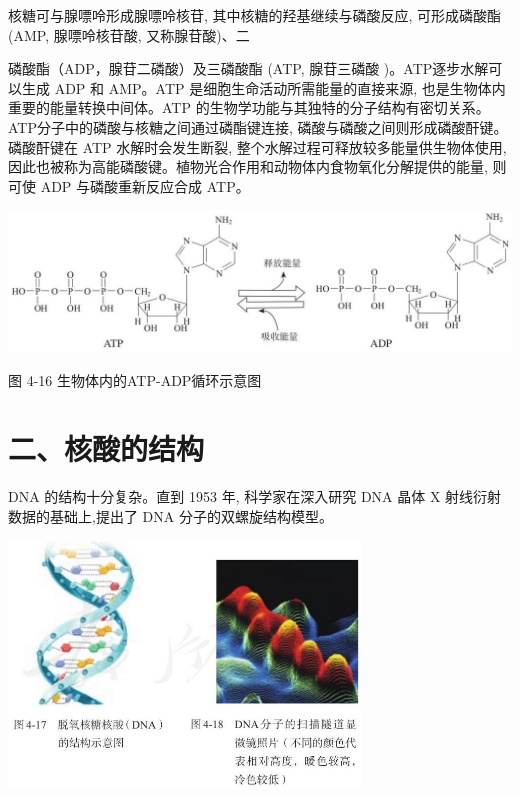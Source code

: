 \documentclass[10pt]{article}
\begin{document}
核糖可与腺嘌呤形成腺嘌呤核苷, 其中核糖的羟基继续与磷酸反应, 可形成磷酸酯 (AMP, 腺嘌呤核苷酸, 又称腺苷酸)、二

磷酸酯（ADP，腺苷二磷酸）及三磷酸酯 (ATP, 腺苷三磷酸 )。ATP逐步水解可以生成 ADP 和 AMP。ATP 是细胞生命活动所需能量的直接来源, 也是生物体内重要的能量转换中间体。ATP 的生物学功能与其独特的分子结构有密切关系。ATP分子中的磷酸与核糖之间通过磷酯键连接, 磷酸与磷酸之间则形成磷酸酐键。磷酸酐键在 ATP 水解时会发生断裂, 整个水解过程可释放较多能量供生物体使用, 因此也被称为高能磷酸键。植物光合作用和动物体内食物氧化分解提供的能量, 则可使 ADP 与磷酸重新反应合成 ATP。

\begin{center}
\includegraphics[max width=1.0\textwidth]{images/0190efc5-b58a-7c43-bfb0-e0a030df9cfd_129_216803.jpg}
\end{center}

图 4-16 生物体内的ATP-ADP循环示意图

\section*{二、核酸的结构}

DNA 的结构十分复杂。直到 1953 年, 科学家在深入研究 DNA 晶体 \(\mathrm{X}\) 射线衍射数据的基础上,提出了 DNA 分子的双螺旋结构模型。

\begin{center}
\includegraphics[max width=0.7\textwidth]{images/0190efc5-b58a-7c43-bfb0-e0a030df9cfd_129_841980.jpg}
\end{center}
\end{document}
